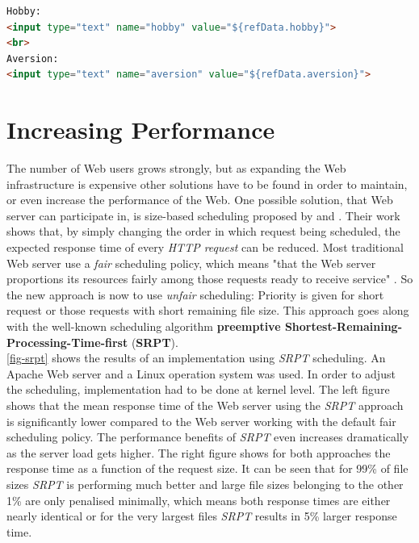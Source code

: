 \documentclass[
  a4paper,               %
  twoside,               %
  headings=small,        %
  DIV=12,                %
  BCOR=1cm,              %
  headinclude=true,      %
  footinclude=true,      %
  numbers=noenddot,      %
  11pt]{scrartcl}        %
\begin{document}
\begin{lstlisting}[language=html, captionpos=b,caption={Java embedded in HTML. Taken from \cite{downey2008web}},label=lst:jsp]
Hobby:
<input type="text" name="hobby" value="${refData.hobby}">
<br>
Aversion:
<input type="text" name="aversion" value="${refData.aversion}">

\end{lstlisting}

\section{Increasing Performance}

The number of Web users grows strongly, but as expanding the Web infrastructure is expensive other solutions have to be found in order to maintain, or even increase the performance of the Web. One possible solution, that Web server can participate in, is size-based scheduling proposed by \cite{schroederSize} and \cite{schorederSchedule}. Their work shows that, by simply changing the order in which request being scheduled, the expected response time of every \textit{HTTP request} can be reduced. Most traditional Web server use a \textit{fair} scheduling policy, which means "that the Web server proportions its resources fairly among those requests ready to receive service" \cite{schroederSize}. So the new approach is now to use \textit{unfair} scheduling: Priority is given for short request or those requests with short remaining file size. This approach goes along with the well-known scheduling algorithm \textbf{preemptive Shortest-Remaining-Processing-Time-first} (\textbf{SRPT}).\\
\autoref{fig-srpt} shows the results of an implementation using \textit{SRPT} scheduling. An Apache Web server and a Linux operation system was used. In order to adjust the scheduling, implementation had to be done at kernel level. The left figure shows that the mean response time of the Web server using the \textit{SRPT} approach is significantly lower compared to the Web server working with the default fair scheduling policy. The performance benefits of \textit{SRPT} even increases dramatically as the server load gets higher. The right figure shows for both approaches the response time as a function of the request size. It can be seen that for 99\% of file sizes \textit{SRPT} is performing much better and large file sizes belonging to the other 1\% are only penalised minimally, which means both response times are either nearly identical or for the very largest files \textit{SRPT} results in 5\% larger response time.\\
\end{document}
